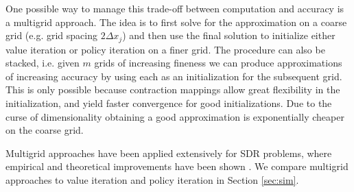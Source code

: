 One possible way to manage this trade-off between computation and accuracy is a multigrid approach. The idea is to first solve for the approximation on a coarse grid (e.g. grid spacing $2\Delta x_j$) and then use the final solution to initialize either value iteration or policy iteration on a finer grid. The procedure can also be stacked, i.e. given $m$ grids of increasing fineness we can produce approximations of increasing accuracy by using each as an initialization for the subsequent grid. This is only possible because contraction mappings allow great flexibility in the initialization, and yield faster convergence for good initializations. Due to the curse of dimensionality obtaining a good approximation is exponentially cheaper on the coarse grid. 

Multigrid approaches have been applied extensively for SDR problems, where empirical and theoretical improvements have been shown \cite{Alla2015, Chow1991}. We compare multigrid approaches to value iteration and policy iteration in Section \ref{sec:sim}.
